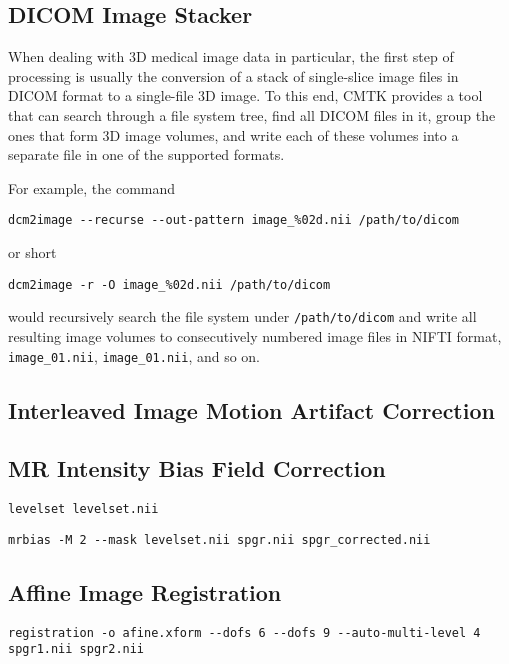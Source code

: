 \documentclass{InsightArticle}
\begin{document}
\subsection{DICOM Image Stacker}

When dealing with 3D medical image data in particular, the first step of
processing is usually the conversion of a stack of single-slice image files in
DICOM format to a single-file 3D image. To this end, CMTK provides a tool that
can search through a file system tree, find all DICOM files in it, group the
ones that form 3D image volumes, and write each of these volumes into a
separate file in one of the supported formats.

For example, the command
\begin{verbatim}
dcm2image --recurse --out-pattern image_%02d.nii /path/to/dicom
\end{verbatim}
or short
\begin{verbatim}
dcm2image -r -O image_%02d.nii /path/to/dicom
\end{verbatim}
would recursively search the file system under {\tt /path/to/dicom} and write
all resulting image volumes to consecutively numbered image files in NIFTI
format, {\tt image\_01.nii},  {\tt image\_01.nii}, and so on.

\subsection{Interleaved Image Motion Artifact Correction}

\subsection{MR Intensity Bias Field Correction}

\begin{verbatim}
levelset levelset.nii
\end{verbatim}

\begin{verbatim}
mrbias -M 2 --mask levelset.nii spgr.nii spgr_corrected.nii
\end{verbatim}

\subsection{Affine Image Registration}


\begin{verbatim}
registration -o afine.xform --dofs 6 --dofs 9 --auto-multi-level 4 spgr1.nii spgr2.nii
\end{verbatim}
\end{document}
